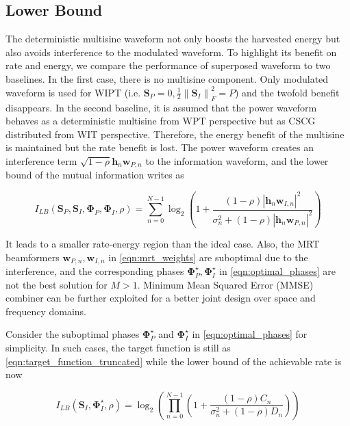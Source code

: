 \subsection{Lower Bound}\label{sec:lower-bound}
The deterministic multisine waveform not only boosts the harvested energy but also avoids interference to the modulated waveform. To highlight its benefit on rate and energy, we compare the performance of superposed waveform to two baselines. In the first case, there is no multisine component. Only modulated waveform is used for WIPT (i.e. ${{\mathbf{S}}_P} = 0,\frac{1}{2}\left\| {{{\mathbf{S}}_I}} \right\|_F^2 = P$) and the twofold benefit disappears. In the second baseline, it is assumed that the power waveform behaves as a deterministic multisine from WPT perspective but as CSCG distributed from WIT perspective. Therefore, the energy benefit of the multisine is maintained but the rate benefit is lost. The power waveform creates an interference term $\sqrt {1 - \rho } {{\mathbf{h}}_n}{{\mathbf{w}}_{P,n}}$ to the information waveform, and the lower bound of the mutual information writes as

\begin{equation}\label{eqn:mutual_information_lower_bound}
  {I_{LB}}\left( {{{\mathbf{S}}_P},{{\mathbf{S}}_I},{{\mathbf{\Phi }}_P},{{\mathbf{\Phi }}_I},\rho } \right) = \sum\limits_{n = 0}^{N - 1} {{{\log }_2}} \left( {1 + \frac{{(1 - \rho ){{\left| {{{\mathbf{h}}_n}{{\mathbf{w}}_{I,n}}} \right|}^2}}}{{\sigma _n^2 + (1 - \rho ){{\left| {{{\mathbf{h}}_n}{{\mathbf{w}}_{P,n}}} \right|}^2}}}} \right)
\end{equation}

It leads to a smaller rate-energy region than the ideal case. Also, the MRT beamformers ${{\mathbf{w}}_{P,n}},{{\mathbf{w}}_{I,n}}$ in \eqref{eqn:mrt_weights} are suboptimal due to the interference, and the corresponding phases ${\mathbf{\Phi }}_P^ \star, {\mathbf{\Phi }}_I^ \star $ in \eqref{eqn:optimal_phases} are not the best solution for $M > 1$. Minimum Mean Squared Error (MMSE) combiner can be further exploited for a better joint design over space and frequency domains.

Consider the suboptimal phases ${\mathbf{\Phi }}_P^ \star $ and ${\mathbf{\Phi }}_I^ \star $ in \eqref{eqn:optimal_phases} for simplicity. In such cases, the target function is still as \eqref{eqn:target_function_truncated} while the lower bound of the achievable rate is now

\begin{equation}\label{mutual_information_lower_bound_rewritten}
  {I_{LB}}\left( {{{\mathbf{S}}_I},{\mathbf{\Phi }}_I^ \star ,\rho } \right) = {\log _2}\left( {\prod\limits_{n = 0}^{N - 1} {\left( {1 + \frac{{(1 - \rho ){C_n}}}{{\sigma _n^2 + (1 - \rho ){D_n}}}} \right)} } \right)
\end{equation}

